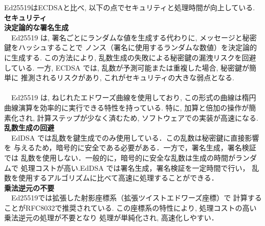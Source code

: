 Ed25519はECDSAと比べ, 以下の点でセキュリティと処理時間が向上している.\\[1em]
{\large\textbf{セキュリティ}}\\[1em]
\noindent\textbf{決定論的な署名生成}\\
　Ed25519 は, 署名ごとにランダムな値を生成する代わりに, 
メッセージと秘密鍵をハッシュすることで 
ノンス（署名に使用するランダムな数値）を決定論的に生成する.
この方法により, 乱数生成の失敗による秘密鍵の漏洩リスクを回避している.
一方, ECDSA では, 乱数が予測可能または重複した場合, 秘密鍵が簡単に
推測されるリスクがあり, これがセキュリティの大きな弱点となる.\\[1em]
\\[1em]
　Ed25519 は, ねじれたエドワーズ曲線を使用しており, 
この形式の曲線は楕円曲線演算を効率的に実行できる特性を持っている.
特に, 加算と倍加の操作が簡素化され, 計算ステップが少なく済むため, 
ソフトウェアでの実装が高速になる.\\

\noindent\textbf{乱数生成の回避} \leavevmode\\
　EdDSA では乱数を鍵生成でのみ使用している．この乱数は秘密鍵に直接影響を
与えるため，暗号的に安全である必要がある．一方で，署名生成，署名検証では
乱数を使用しない．一般的に，暗号的に安全な乱数は生成の時間がランダムで
処理コストが高い.EdDSA では署名生成，署名検証を一定時間で行い，
乱数を使用するアルゴリズムに比べて高速に処理することができる．\\

\noindent\textbf{乗法逆元の不要} \leavevmode\\
　Ed25519では拡張した射影座標系（拡張ツイストエドワーズ座標）で
計算することがRFC8032で推奨されている.
この座標系の特性により, 処理コストの高い乗法逆元の処理が不要となり
処理が単純化され, 高速化しやすい．


